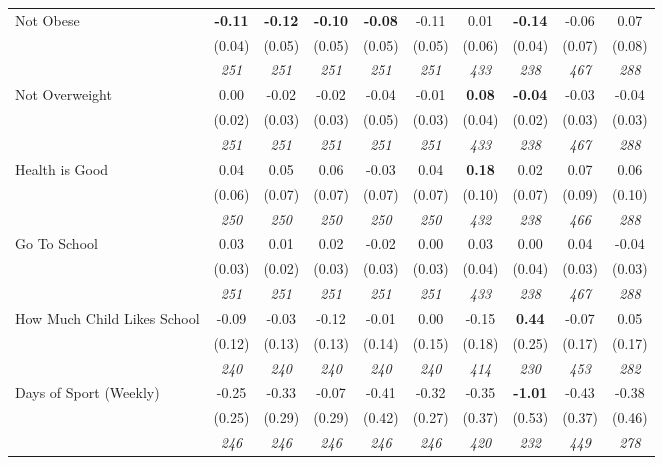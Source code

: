 \begin{tabular}{l c c c c c c c c c}
Not Obese & \textbf{ -0.11 } & \textbf{ -0.12 } & \textbf{ -0.10 } & \textbf{-0.08} & -0.11 & 0.01 & \textbf{-0.14} & -0.06 & 0.07 \\
& (0.04) & (0.05) & (0.05) & (0.05) & (0.05) & (0.06) & (0.04) & (0.07) & (0.08) \\
& \textit{ 251 } & \textit{ 251 } & \textit{ 251 } & \textit{ 251 } & \textit{ 251 } & \textit{ 433 } & \textit{ 238 } & \textit{ 467 } & \textit{ 288 } \\
Not Overweight & 0.00 & -0.02 & -0.02 & -0.04 & -0.01 & \textbf{ 0.08 } & \textbf{-0.04} & -0.03 & -0.04 \\
& (0.02) & (0.03) & (0.03) & (0.05) & (0.03) & (0.04) & (0.02) & (0.03) & (0.03) \\
& \textit{ 251 } & \textit{ 251 } & \textit{ 251 } & \textit{ 251 } & \textit{ 251 } & \textit{ 433 } & \textit{ 238 } & \textit{ 467 } & \textit{ 288 } \\
Health is Good & 0.04 & 0.05 & 0.06 & -0.03 & 0.04 & \textbf{ 0.18 } & 0.02 & 0.07 & 0.06 \\
& (0.06) & (0.07) & (0.07) & (0.07) & (0.07) & (0.10) & (0.07) & (0.09) & (0.10) \\
& \textit{ 250 } & \textit{ 250 } & \textit{ 250 } & \textit{ 250 } & \textit{ 250 } & \textit{ 432 } & \textit{ 238 } & \textit{ 466 } & \textit{ 288 } \\
Go To School & 0.03 & 0.01 & 0.02 & -0.02 & 0.00 & 0.03 & 0.00 & 0.04 & -0.04 \\
& (0.03) & (0.02) & (0.03) & (0.03) & (0.03) & (0.04) & (0.04) & (0.03) & (0.03) \\
& \textit{ 251 } & \textit{ 251 } & \textit{ 251 } & \textit{ 251 } & \textit{ 251 } & \textit{ 433 } & \textit{ 238 } & \textit{ 467 } & \textit{ 288 } \\
How Much Child Likes School & -0.09 & -0.03 & -0.12 & -0.01 & 0.00 & -0.15 & \textbf{0.44} & -0.07 & 0.05 \\
& (0.12) & (0.13) & (0.13) & (0.14) & (0.15) & (0.18) & (0.25) & (0.17) & (0.17) \\
& \textit{ 240 } & \textit{ 240 } & \textit{ 240 } & \textit{ 240 } & \textit{ 240 } & \textit{ 414 } & \textit{ 230 } & \textit{ 453 } & \textit{ 282 } \\
Days of Sport (Weekly) & -0.25 & -0.33 & -0.07 & -0.41 & -0.32 & -0.35 & \textbf{-1.01} & -0.43 & -0.38 \\
& (0.25) & (0.29) & (0.29) & (0.42) & (0.27) & (0.37) & (0.53) & (0.37) & (0.46) \\
& \textit{ 246 } & \textit{ 246 } & \textit{ 246 } & \textit{ 246 } & \textit{ 246 } & \textit{ 420 } & \textit{ 232 } & \textit{ 449 } & \textit{ 278 } \\

\end{tabular}
